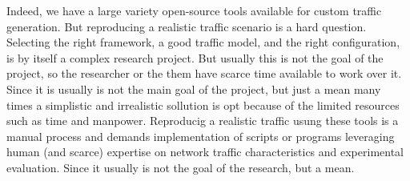 

Indeed, we have a large variety open-source tools available for custom traffic generation. But reproducing a realistic traffic scenario is a hard question. Selecting the right framework, a good traffic model, and the right configuration, is by itself a complex research project\cite{legotg-paper}\cite{selfsimilar-ethernet}. But usually this is not the goal of the project, so the researcher or the them have scarce time available to work over it. Since it is usually is not the main goal of the project, but just a mean many times a simplistic and irrealistic sollution is opt because of the limited resources such as time and manpower.   Reproducig a realistic traffic usung these tools is a manual process and demands implementation of scripts or programs leveraging human (and scarce) expertise on network traffic characteristics  and experimental evaluation. Since it usually is not the goal of the research, but a mean. 


